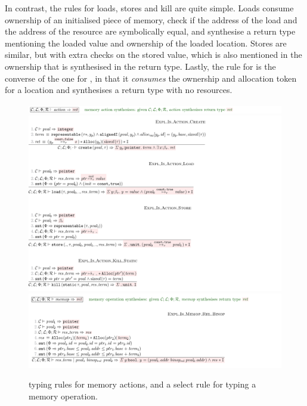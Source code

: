 In contrast, the rules for loads, stores and kill are quite simple. Loads
consume ownership of an initialised piece of memory, check if the address of the load and the
address of the resource are symbolically equal, and synthesise a return type
mentioning the loaded value and ownership of the loaded location. Stores are
similar, but with extra checks on the stored value, which is also mentioned in
the ownership that is synthesised in the return type. Lastly, the rule for
 is the converse of the one for , %
in that it \emph{consumes} the ownership and allocation token for a location
and synthesises a return type with no resources.

\begin{figure}[tp]
    \includegraphics{figures/kernel-mem-action-typing-1}
    \includegraphics{figures/kernel-mem-action-typing-2}
    \includegraphics{figures/kernel-memop-typing}
    \caption{ typing rules for memory actions, and a select rule
        for typing a memory operation.}\label{fig:typing-mem-action}
\end{figure}

